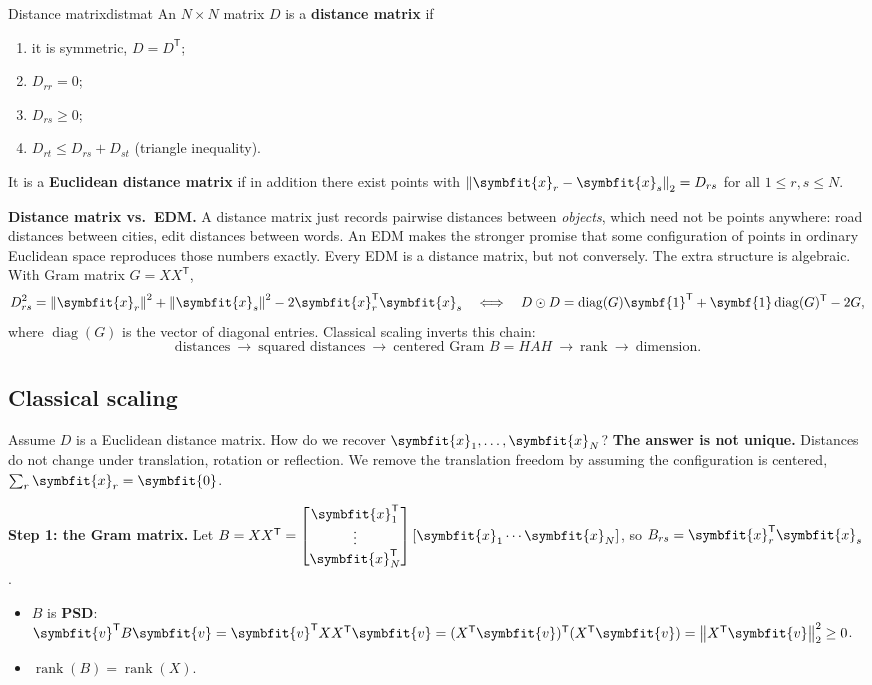 \documentclass[11pt]{article}
\newcommand{\bm}[1]{\symbfit{#1}}
\newcommand{\vx}{\bm{x}}
\newcommand{\one}{\symbf{1}}
\newcommand{\T}{^{\mathsf T}}
\newcommand{\rank}{\operatorname{rank}}
\newcommand{\norm}[1]{\left\lVert #1\right\rVert}
\newcommand{\had}{\odot}
\begin{document}
\begin{definition}{Distance matrix}{distmat}
An $N\times N$ matrix $D$ is a \textbf{distance matrix} if
\begin{enumerate}[nosep,label=\arabic*)]
\item it is symmetric, $D=D\T$;
\item $D_{rr}=0$;
\item $D_{rs}\ge0$;
\item $D_{rt}\le D_{rs}+D_{st}$ (triangle inequality).
\end{enumerate}
It is a \textbf{Euclidean distance matrix} if in addition there exist points with
$\norm{\vx_r-\vx_s}_2=D_{rs}$ for all $1\le r,s\le N$.
\end{definition}

\begin{intuition}
\textbf{Distance matrix vs.\ EDM.} A distance matrix just records pairwise distances between
\emph{objects}, which need not be points anywhere: road distances between cities, edit distances
between words. An EDM makes the stronger promise that some configuration of points in ordinary
Euclidean space reproduces those numbers exactly. Every EDM is a distance matrix, but not
conversely. The extra structure is algebraic. With Gram matrix $G=XX\T$,
\[
D_{rs}^2=\norm{\vx_r}^2+\norm{\vx_s}^2-2\vx_r\T\vx_s
\quad\Longleftrightarrow\quad
D\had D=\operatorname{diag}(G)\one\T+\one\operatorname{diag}(G)\T-2G,
\]
where $\operatorname{diag}(G)$ is the vector of diagonal entries. Classical scaling inverts this chain:
\[
\text{distances}\ \longrightarrow\ \text{squared distances}\ \longrightarrow\ \text{centered Gram } B=HAH\ \longrightarrow\ \text{rank}\ \longrightarrow\ \text{dimension}.
\]
\end{intuition}

\subsection{Classical scaling}

Assume $D$ is a Euclidean distance matrix. How do we recover $\vx_1,\dots,\vx_N$?
\textbf{The answer is not unique.} Distances do not change under translation, rotation
or reflection. We remove the translation freedom by assuming the configuration is
centered, $\sum_r\vx_r=\bm0$.

\textbf{Step 1: the Gram matrix.} Let
$B=XX\T=\begin{bmatrix}\vx_1\T\\\vdots\\\vx_N\T\end{bmatrix}[\vx_1\cdots\vx_N]$, so $B_{rs}=\vx_r\T\vx_s$.
\begin{itemize}[nosep]
\item $B$ is \textbf{PSD}: $\bm v\T B\bm v=\bm v\T XX\T\bm v=(X\T\bm v)\T(X\T\bm v)=\norm{X\T\bm v}_2^2\ge0$.
\item $\rank(B)=\rank(X)$.
\end{itemize}
\end{document}
